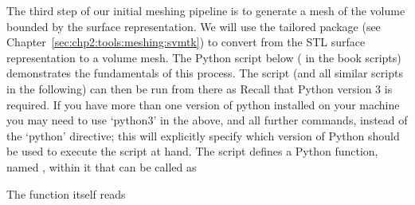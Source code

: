 %
%
The third step of our initial meshing pipeline is to generate a mesh
of the volume bounded by the surface representation. We will use the
tailored package \svmtk{} (see
Chapter~\ref{sec:chp2:tools:meshing:svmtk}) to convert from the STL
surface representation to a volume mesh. The Python script below (
 in the book scripts)
demonstrates the fundamentals of this process. The script (and all
similar scripts in the following) can then be run from there as
Recall that Python version 3 is required.  If you have more than one version 
of python installed on your machine you may need to use `python3' in the 
above, and all further commands, instead of the `python' directive; this will 
explicitly specify which version of Python should be used to execute the 
script at hand.  %
%
The script  defines a Python function, 
named , within it that can be called as

\noindent The function itself reads

